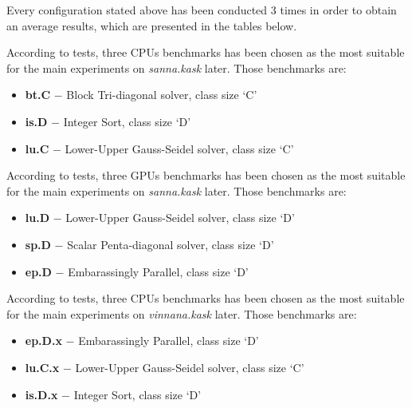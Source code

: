 Every configuration stated above has been conducted 3 times in order to obtain
an average results, which are presented in the tables below.

\newpage



According to tests, three CPUs benchmarks has been chosen as the most suitable for
the main experiments on \emph{sanna.kask} later. Those benchmarks are:

\begin{itemize}
    \item \textbf{bt.C} $-$ Block Tri-diagonal solver, class size `C'
    \item \textbf{is.D} $-$ Integer Sort, class size `D'
    \item \textbf{lu.C} $-$ Lower-Upper Gauss-Seidel solver, class size `C'
\end{itemize}



According to tests, three GPUs benchmarks has been chosen as the most suitable for
the main experiments on \emph{sanna.kask} later. Those benchmarks are:

\begin{itemize}
    \item \textbf{lu.D} $-$ Lower-Upper Gauss-Seidel solver, class size `D'
    \item \textbf{sp.D} $-$ Scalar Penta-diagonal solver, class size `D'
    \item \textbf{ep.D} $-$ Embarassingly Parallel, class size `D'
\end{itemize}
\newpage



According to tests, three CPUs benchmarks has been chosen as the most suitable for
the main experiments on \emph{vinnana.kask} later. Those benchmarks are:

\begin{itemize}
    \item \textbf{ep.D.x} $-$ Embarassingly Parallel, class size `D'
    \item \textbf{lu.C.x} $-$ Lower-Upper Gauss-Seidel solver, class size `C'
    \item \textbf{is.D.x} $-$ Integer Sort, class size `D'
\end{itemize}



